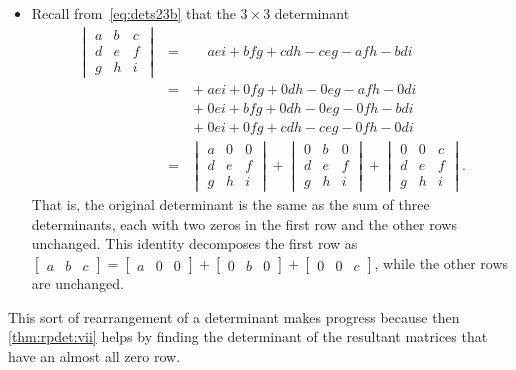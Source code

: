 \begin{example}
\begin{itemize}
\item Recall from~\eqref{eq:dets23b} that the \(3\times3\) determinant
\begin{eqnarray*}
\begin{vmatrix} a&b&c\\d&e&f\\g&h&i \end{vmatrix}
&=&\phantom{{}+}aei+bfg+cdh-ceg-afh-bdi
\\&=&{}+aei+0fg+0dh-0eg-afh-0di
\\&&{}+0ei+bfg+0dh-0eg-0fh-bdi
\\&&{}+0ei+0fg+cdh-ceg-0fh-0di
\\&=&\begin{vmatrix} a&0&0\\d&e&f\\g&h&i \end{vmatrix}
+\begin{vmatrix} 0&b&0\\d&e&f\\g&h&i \end{vmatrix}
+\begin{vmatrix} 0&0&c\\d&e&f\\g&h&i \end{vmatrix}.
\end{eqnarray*}
That is, the original determinant is the same as the sum of three determinants, each with two zeros in the first row and the other rows unchanged.
This identity decomposes the first row as \(\begin{bmatrix} a&b&c \end{bmatrix}=\begin{bmatrix} a&0&0 \end{bmatrix}+\begin{bmatrix} 0&b&0 \end{bmatrix}+\begin{bmatrix} 0&0&c \end{bmatrix}\), while the other rows are unchanged.
\end{itemize}
This sort of rearrangement of a determinant makes progress because then \autoref{thm:rpdet:vii} helps by finding the determinant of the resultant matrices that have an almost all zero row.
\end{example}

